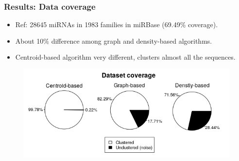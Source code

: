 \documentclass{beamer}
\begin{document}
\begin{frame}
\frametitle{Results: Data coverage}
\begin{itemize}
\item Ref: 28645 miRNAs in 1983 families in miRBase (69.49\% coverage).
\item About 10\% difference among graph and density-based algorithms.
\item Centroid-based algorithm very different, clusters almost all the sequences.
\end{itemize}
\begin{figure}
\includegraphics[scale=0.5]{img/coverage.png}
\end{figure}
\end{frame}
\end{document}
